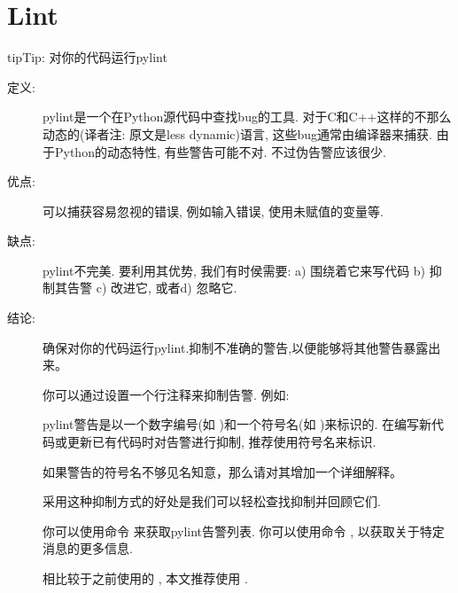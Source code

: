 \documentclass[a4paper,10pt,english]{sphinxmanual}
\begin{document}
\section{Lint}
\label{\detokenize{python_language_rules:lint}}
\begin{sphinxadmonition}{tip}{Tip:}
对你的代码运行pylint
\end{sphinxadmonition}
\begin{description}
\item[{定义:}] \leavevmode
pylint是一个在Python源代码中查找bug的工具. 对于C和C++这样的不那么动态的(译者注: 原文是less dynamic)语言, 这些bug通常由编译器来捕获. 由于Python的动态特性, 有些警告可能不对. 不过伪告警应该很少.

\item[{优点:}] \leavevmode
可以捕获容易忽视的错误, 例如输入错误, 使用未赋值的变量等.

\item[{缺点:}] \leavevmode
pylint不完美. 要利用其优势, 我们有时侯需要: a) 围绕着它来写代码 b) 抑制其告警 c) 改进它, 或者d) 忽略它.

\item[{结论:}] \leavevmode
确保对你的代码运行pylint.抑制不准确的警告,以便能够将其他警告暴露出来。

你可以通过设置一个行注释来抑制告警. 例如:

%
\begin{sphinxVerbatim}[commandchars=\\\{\}]
    
\end{sphinxVerbatim}

pylint警告是以一个数字编号(如  )和一个符号名(如  )来标识的. 在编写新代码或更新已有代码时对告警进行抑制, 推荐使用符号名来标识.

如果警告的符号名不够见名知意，那么请对其增加一个详细解释。

采用这种抑制方式的好处是我们可以轻松查找抑制并回顾它们.

你可以使用命令  来获取pylint告警列表. 你可以使用命令  , 以获取关于特定消息的更多信息.

相比较于之前使用的  , 本文推荐使用  .


\end{description}
\end{document}

